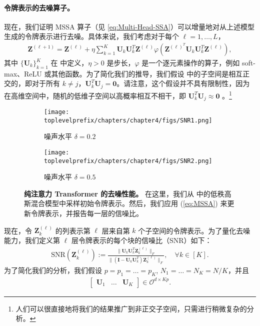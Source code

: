 \documentclass[../../book-main.tex]{subfiles}
\begin{document}
\paragraph{令牌表示的去噪算子。} 现在，我们证明 MSSA 算子（见 \eqref{eq:Multi-Head-SSA}）可以增量地对从上述模型生成的令牌表示进行去噪。具体来说，我们考虑对于每个 $\ell =1 ,\dots,L$，
\begin{align}\label{eq:MSSA}
    \bm Z^{(\ell+1)} =  \bm Z^{(\ell)} + \eta \sum_{k=1}^K \bm U_k\bm U_k^T \bm Z^{(\ell)} \varphi \left(\bm Z^{(\ell)^T}\bm U_k\bm U_k^T\bm Z^{(\ell)} \right),
\end{align}
其中 $\{\bm U_k\}_{k=1}^K$ 在  中定义，$\eta > 0$ 是步长，$\varphi$ 是一个逐元素操作的算子，例如 soft-max、ReLU 或其他函数。为了简化我们的推导，我们假设  中的子空间是相互正交的，即对于所有 $k \neq j$，$\bm U_k^T\bm U_j = \bm 0$。请注意，这个假设并不具有限制性，因为在高维空间中，随机的低维子空间以高概率相互不相干，即 $\bm U_k^T\bm U_j \approx \bm 0$ \citep{Wright-Ma-2021}。\footnote{人们可以很直接地将我们的结果推广到非正交子空间，只需进行稍微复杂的分析。}

\begin{figure}[t]
    \begin{subfigure}[t]{0.45\textwidth}
        \centering
        \texttt{[image: \\toplevelprefix/chapters/chapter4/figs/SNR1.png]}
        \caption{噪声水平 $\delta = 0.2$}
    \end{subfigure}
    \hfill
    \begin{subfigure}[t]{0.45\textwidth}
        \centering
        \texttt{[image: \\toplevelprefix/chapters/chapter4/figs/SNR2.png]}
        \caption{噪声水平 $\delta = 0.5$}
    \end{subfigure}
    \caption{{\bf 纯注意力 Transformer 的去噪性能。} 在这里，我们从  中的低秩高斯混合模型中采样初始令牌表示。然后，我们应用 (\ref{eq:MSSA}) 来更新令牌表示，并报告每一层的信噪比。}  \label{fig:MSSA}
\end{figure}


现在，令 $\bm Z_k^{(\ell)}$ 的列表示第 $\ell$ 层来自第 $k$ 个子空间的令牌表示。为了量化去噪能力，我们定义第 $\ell$ 层令牌表示的每个块的信噪比（SNR）如下：
\begin{align}\label{def:SNR}
\mathrm{SNR}(\bm Z_k^{(\ell)}) :=  \frac{\|\bm U_k\bm U_k^T\bm Z_k^{(\ell)} \|_F}{\|(\bm I - \bm U_k\bm U_k^T)\bm Z_k^{(\ell)} \|_F},\quad \forall k \in [K].
\end{align}
为了简化我们的分析，我们假设 $p=p_1=\dots=p_K$, $N_1=\dots=N_K=N/K$，并且
\begin{align}\label{eq:orth}
\begin{bmatrix}
\bm U_1 & \dots & \bm U_K
\end{bmatrix} \in \mathcal{O}^{d\times Kp}.
\end{align}
\end{document}
